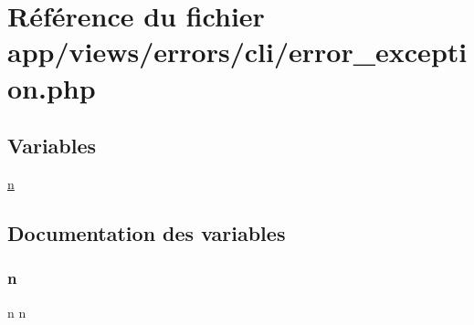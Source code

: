 \hypertarget{cli_2error__exception_8php}{}\section{Référence du fichier app/views/errors/cli/error\+\_\+exception.php}
\label{cli_2error__exception_8php}
\subsection*{Variables}
\begin{DoxyCompactItemize}
\item 
\hyperlink{cli_2error__exception_8php_a2e6b16bbc42094e4c51ade3c10afdcf1}{n}
\end{DoxyCompactItemize}


\subsection{Documentation des variables}
\mbox{\label{cli_2error__exception_8php_a2e6b16bbc42094e4c51ade3c10afdcf1}} 
\subsubsection{\texorpdfstring{n}{n}}
{\footnotesize\ttfamily n n}

